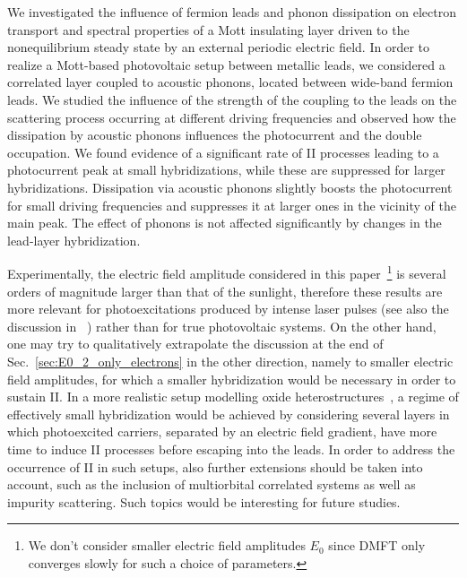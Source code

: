 \documentclass[aps,prb,groupedaddress,showpacs,twocolumn,superscriptaddress,10pt]{revtex4-2}
\begin{document}
We investigated the influence of fermion leads and phonon dissipation on electron transport and spectral properties of a Mott insulating layer driven to the nonequilibrium steady state by an external periodic electric field. In order to realize a Mott-based photovoltaic setup between metallic leads, we considered a correlated layer coupled to acoustic phonons, located between wide-band fermion leads. 
We studied the influence of the strength 
of the coupling to the leads on the scattering process occurring at different driving frequencies and observed how the dissipation by acoustic phonons influences the photocurrent and the double occupation. We found evidence of a significant rate of II processes leading to a photocurrent peak at small hybridizations, while these are suppressed  for larger hybridizations. Dissipation via acoustic phonons slightly boosts the photocurrent for small driving frequencies and suppresses it at larger ones in the vicinity of the main peak. The effect of phonons is not affected significantly by changes in the lead-layer hybridization.


 
Experimentally, the electric field amplitude considered in this paper~\footnote{We don't consider smaller electric field amplitudes $E_0$ since DMFT only converges slowly for such a choice of parameters.} is several orders of magnitude larger than that of the sunlight, therefore these results are more relevant for photoexcitations produced by intense laser pulses (see also the discussion in ~\cite{mu.we.18}) rather than for true photovoltaic systems. On the other hand, one may try to qualitatively extrapolate the discussion at the end of Sec.~\ref{sec:E0_2_only_electrons} in the other direction,  namely to smaller electric field amplitudes, for which a smaller hybridization 
would be
necessary in order to sustain II. In a more realistic setup modelling oxide heterostructures~\cite{as.bl.13,pe.be.19}, a regime of effectively small hybridization would be achieved by considering several layers in which photoexcited carriers, separated by an electric field gradient, have more time to induce II processes before escaping into the leads. In order to address the occurrence of II in such setups, also further extensions should be taken into account, such as the inclusion of multiorbital correlated systems as well as impurity scattering. Such topics would be interesting for future studies.
    
\end{document}
